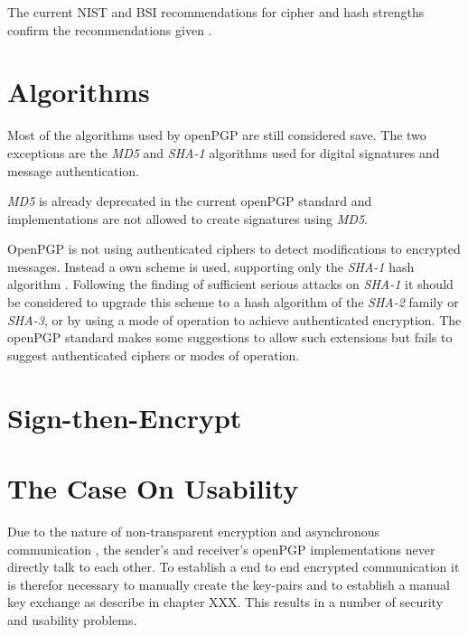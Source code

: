 The current NIST and BSI recommendations for cipher and hash strengths confirm the recommendations given \cite{keylenNIST} \cite{KeylenBSI}. 

\section{Algorithms}



Most of the algorithms used by openPGP are still considered save. 
The two exceptions are the \textit{MD5} and \textit{SHA-1} algorithms used for digital signatures and message authentication. 

\textit{MD5} is already deprecated in the current openPGP standard \citep[section 14]{RFC4880} and implementations are not allowed to create signatures using \textit{MD5}. 

OpenPGP is not using authenticated ciphers to detect modifications to encrypted messages.
Instead a own scheme is used, supporting only the \textit{SHA-1} hash algorithm \citep[section 5.13]{RFC4880}. 
Following the finding of sufficient serious attacks on \textit{SHA-1} \cite{SHA1attack} it should be considered to upgrade this scheme to a hash algorithm of the \textit{SHA-2} family or \textit{SHA-3}, or by using a mode of operation to achieve authenticated encryption. The openPGP standard makes some suggestions to allow such extensions \citep[section 13.11]{RFC4880} but fails to suggest authenticated ciphers or modes of operation.


\section{Sign-then-Encrypt}



\section{The Case On Usability}



Due to the nature of non-transparent encryption and asynchronous communication \citep[section 2.1]{RFC4880}, the sender's and receiver's openPGP implementations never directly talk to each other.
To establish a end to end encrypted communication it is therefor necessary to manually create the key-pairs and to establish a manual key exchange as describe in chapter XXX. 
This results in a number of security and usability problems. \\

